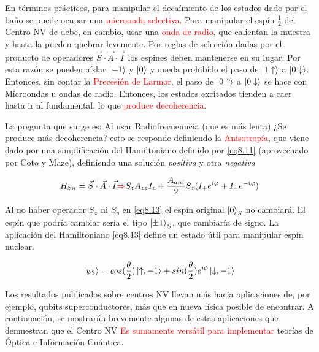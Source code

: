 \documentclass{book}
\begin{document}
En términos prácticos, para manipular el decaímiento de los estados dado por el baño se puede ocupar una \textcolor{red}{microonda selectiva}. Para manipular el espín $\frac{1}{2}$ del Centro NV de debe, en cambio, usar una \textcolor{red}{onda de radio}, que calientan la muestra y hasta la pueden quebrar levemente. Por reglas de selección dadas por el producto de operadores $\vec{S}\cdot\vec{A}\cdot\vec{I}$ los espines deben mantenerse en su lugar. Por esta razón se pueden aíslar $\ket{-1}$ y $\ket{0}$ y queda prohibido el paso de $\ket{1\uparrow}$ a $\ket{0\downarrow}$. Entonces, sin contar la \textcolor{red}{Precesión de Larmor}, el paso de $\ket{0\uparrow}$ a $\ket{0\downarrow}$ se hace con Microondas u ondas de radio. Entonces, los estados excitados tienden a caer hasta ir al fundamental, lo que \textcolor{red}{produce decoherencia}.

La pregunta que surge es: Al usar Radiofrecuenncia (que es más lenta) ¿Se produce más decoherencia? esto se responde definiendo la \textcolor{red}{Anisotropía}, que viene dado por una simplificación del Hamiltoniano definido por \ref{eq8.11} (aprovechado por Coto y Maze), definiendo una solución \textit{positiva} y otra \textit{negativa}

\begin{equation}\label{eq8.13}H_{Sn}=\vec{S}\cdot\vec{A}\cdot\vec{I} \textcolor{red}{\Rightarrow} S_zA_{zz}I_z+\frac{A_{ani}}{2}S_z(I_+e^{i\varphi}+I_-e^{-i\varphi})\end{equation}

Al no haber operador $S_x$ ni $S_y$ en \ref{eq8.13} el espín original $\ket{0}_S$ no cambiará. El espín que podría cambiar sería el tipo $\ket{\pm 1}_S$, que cambiaría de signo. La aplicación del Hamiltoniano \ref{eq8.13} define un estado útil para manipular espín nuclear.

\begin{equation}\label{eq8.14}\ket{\psi_3}=cos(\frac{\theta}{2})\ket{\uparrow, -1}+sin(\frac{\theta}{2})e^{i\phi}\ket{\downarrow, -1}\end{equation}

Los resultados publicados sobre centros NV llevan más hacia aplicaciones de, por ejemplo, qubits superconductores, más que en nueva física posible de encontrar. A continuación, se mostrarán brevemente algunas de estas aplicaciones que demuestran que el Centro NV \textcolor{red}{Es sumamente versátil para implementar} teorías de Óptica e Información Cuántica.
\end{document}
